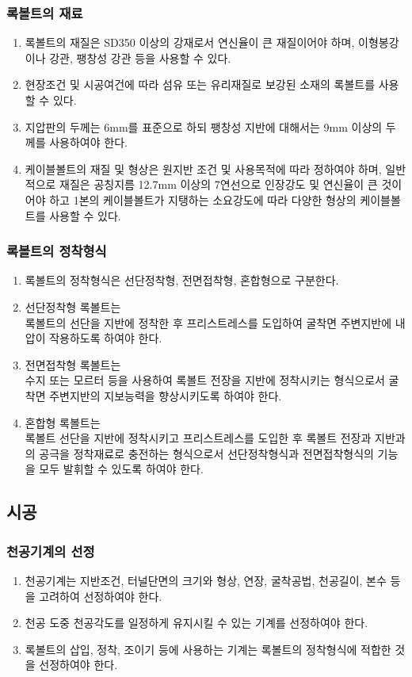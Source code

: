 \subsubsection{록볼트의 재료}
\begin{enumerate}
\item  록볼트의 재질은 SD350 이상의 강재로서 연신율이 큰 재질이어야 하며, 이형봉강이나 강관, 팽창성 강관 등을 사용할 수 있다.  
\item  현장조건 및 시공여건에 따라 섬유 또는 유리재질로 보강된 소재의 록볼트를 사용할 수 있다.  
\item  지압판의 두께는 6mm를 표준으로 하되 팽창성 지반에 대해서는 9mm 이상의 두께를 사용하여야 한다.  
\item  케이블볼트의 재질 및 형상은 원지반 조건 및 사용목적에 따라 정하여야 하며, 
       일반적으로 재질은 공칭지름 12.7mm 이상의 7연선으로 인장강도 및 연신율이 큰 것이어야 하고 
       1본의 케이블볼트가 지탱하는 소요강도에 따라 다양한 형상의 케이블볼트를 사용할 수 있다.  
\end{enumerate}

\subsubsection{록볼트의 정착형식}
\begin{enumerate}
\item  록볼트의 정착형식은 선단정착형, 전면접착형, 혼합형으로 구분한다.  
\item  선단정착형 록볼트는 \\ 록볼트의 선단을 지반에 정착한 후 프리스트레스를 도입하여 굴착면 주변지반에 내압이 작용하도록 하여야 한다.  
\item  전면접착형 록볼트는 \\ 수지 또는 모르터 등을 사용하여 록볼트 전장을 지반에 정착시키는 형식으로서 
       굴착면 주변지반의 지보능력을 향상시키도록 하여야 한다.  
\item  혼합형 록볼트는 \\ 록볼트 선단을 지반에 정착시키고 프리스트레스를 도입한 후 록볼트 전장과 지반과의 공극을 
       정착재료로 충전하는 형식으로서 선단정착형식과 전면접착형식의 기능을 모두 발휘할 수 있도록 하여야 한다.  
\end{enumerate}

\subsection{시공}

\subsubsection{천공기계의 선정}
\begin{enumerate}
\item  천공기계는 지반조건, 터널단면의 크기와 형상, 연장, 굴착공법, 천공길이, 본수 등을 고려하여 선정하여야 한다.  
\item  천공 도중 천공각도를 일정하게 유지시킬 수 있는 기계를 선정하여야 한다.  
\item  록볼트의 삽입, 정착, 조이기 등에 사용하는 기계는 록볼트의 정착형식에 적합한 것을 선정하여야 한다.  
\end{enumerate}

